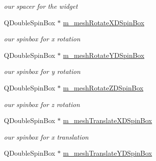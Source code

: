 \begin{DoxyCompactItemize}
\begin{DoxyCompactList}\small\item\em our spacer for the widget \end{DoxyCompactList}\item 
\hypertarget{class_mesh_widget_a04fd332bcf722b71c2da1e05b1f1dde6}{Q\-Double\-Spin\-Box $\ast$ \hyperlink{class_mesh_widget_a04fd332bcf722b71c2da1e05b1f1dde6}{m\-\_\-mesh\-Rotate\-X\-D\-Spin\-Box}}\label{class_mesh_widget_a04fd332bcf722b71c2da1e05b1f1dde6}

\begin{DoxyCompactList}\small\item\em our spinbox for x rotation \end{DoxyCompactList}\item 
\hypertarget{class_mesh_widget_a69d18769fc96a008437a072e29a2d6d2}{Q\-Double\-Spin\-Box $\ast$ \hyperlink{class_mesh_widget_a69d18769fc96a008437a072e29a2d6d2}{m\-\_\-mesh\-Rotate\-Y\-D\-Spin\-Box}}\label{class_mesh_widget_a69d18769fc96a008437a072e29a2d6d2}

\begin{DoxyCompactList}\small\item\em our spinbox for y rotation \end{DoxyCompactList}\item 
\hypertarget{class_mesh_widget_a5e41ed433f956c32749a2667337cb2b0}{Q\-Double\-Spin\-Box $\ast$ \hyperlink{class_mesh_widget_a5e41ed433f956c32749a2667337cb2b0}{m\-\_\-mesh\-Rotate\-Z\-D\-Spin\-Box}}\label{class_mesh_widget_a5e41ed433f956c32749a2667337cb2b0}

\begin{DoxyCompactList}\small\item\em our spinbox for z rotation \end{DoxyCompactList}\item 
\hypertarget{class_mesh_widget_aecdcbe099985d8e399a54cdfbe4698ff}{Q\-Double\-Spin\-Box $\ast$ \hyperlink{class_mesh_widget_aecdcbe099985d8e399a54cdfbe4698ff}{m\-\_\-mesh\-Translate\-X\-D\-Spin\-Box}}\label{class_mesh_widget_aecdcbe099985d8e399a54cdfbe4698ff}

\begin{DoxyCompactList}\small\item\em our spinbox for x translation \end{DoxyCompactList}\item 
\hypertarget{class_mesh_widget_a931d6dc6dbe58dda28e096455303582f}{Q\-Double\-Spin\-Box $\ast$ \hyperlink{class_mesh_widget_a931d6dc6dbe58dda28e096455303582f}{m\-\_\-mesh\-Translate\-Y\-D\-Spin\-Box}}\label{class_mesh_widget_a931d6dc6dbe58dda28e096455303582f}


\end{DoxyCompactItemize}
